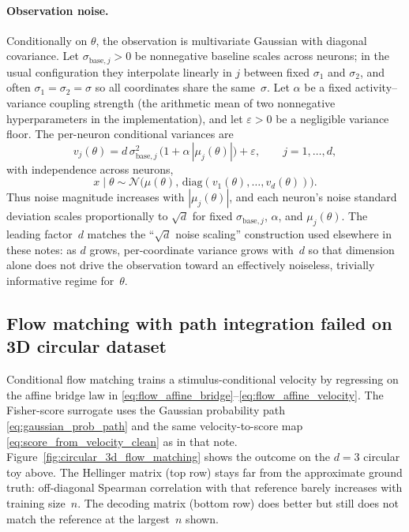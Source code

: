 \paragraph{Observation noise.}
Conditionally on $\theta$, the observation is multivariate Gaussian with diagonal covariance.
Let $\sigma_{\mathrm{base},j}>0$ be nonnegative baseline scales across neurons; in the usual configuration they interpolate linearly in $j$ between fixed $\sigma_{1}$ and $\sigma_{2}$, and often $\sigma_{1}=\sigma_{2}=\sigma$ so all coordinates share the same~$\sigma$.
Let $\alpha$ be a fixed activity--variance coupling strength (the arithmetic mean of two nonnegative hyperparameters in the implementation), and let $\varepsilon>0$ be a negligible variance floor.
The per-neuron conditional variances are
\begin{equation}
  v_j(\theta)
  = d\,\sigma_{\mathrm{base},j}^{2}\,\bigl(1 + \alpha\,|\mu_j(\theta)|\bigr) + \varepsilon,
  \qquad j = 1,\ldots,d,
\end{equation}
with independence across neurons,
\begin{equation}
  x \mid \theta \sim \mathcal{N}\!\bigl(\mu(\theta),\,\mathrm{diag}(v_1(\theta),\ldots,v_d(\theta))\bigr).
\end{equation}
Thus noise magnitude increases with $|\mu_j(\theta)|$, and each neuron's noise standard deviation scales proportionally to $\sqrt{d}$ for fixed $\sigma_{\mathrm{base},j}$, $\alpha$, and $\mu_j(\theta)$.
The leading factor~$d$ matches the ``$\sqrt{d}$ noise scaling'' construction used elsewhere in these notes: as $d$ grows, per-coordinate variance grows with~$d$ so that dimension alone does not drive the observation toward an effectively noiseless, trivially informative regime for~$\theta$.

\subsection{Flow matching with path integration failed on 3D circular dataset}

Conditional flow matching trains a stimulus-conditional velocity by regressing on the affine bridge law in \eqref{eq:flow_affine_bridge}--\eqref{eq:flow_affine_velocity}.
The Fisher-score surrogate uses the Gaussian probability path \eqref{eq:gaussian_prob_path} and the same velocity-to-score map \eqref{eq:score_from_velocity_clean} as in that note.
Figure~\ref{fig:circular_3d_flow_matching} shows the outcome on the $d=3$ circular toy above.
The Hellinger matrix (top row) stays far from the approximate ground truth: off-diagonal Spearman correlation with that reference barely increases with training size~$n$.
The decoding matrix (bottom row) does better but still does not match the reference at the largest~$n$ shown.

